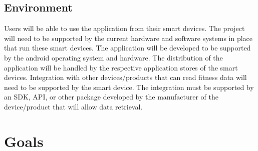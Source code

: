 \documentclass{article}
\begin{document}
\subsection{Environment}

Users will be able to use the application from their smart devices. 
The project will need to be supported by the current hardware and software systems in place that run these smart devices. 
The application will be developed to be supported by the android operating system and hardware. 
The distribution of the application will be handled by the respective application stores of the smart devices. 
Integration with other devices/products that can read fitness data will need to be supported by the smart device. 
The integration must be supported by an SDK, API, or other package developed by the manufacturer of the device/product that will allow data retrieval.
\section{Goals}
\label{sec:goals}
\end{document}
